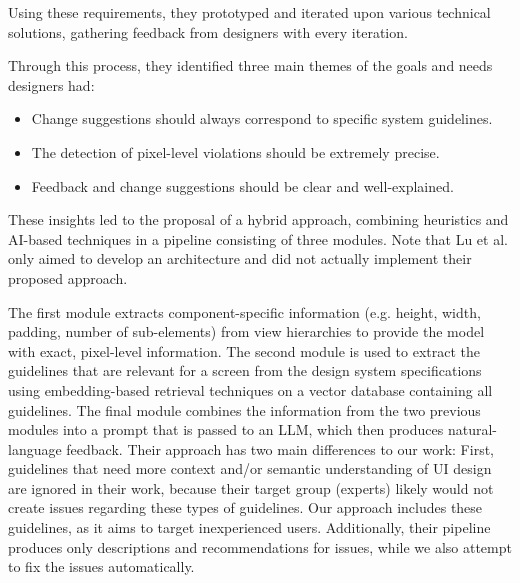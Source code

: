\documentclass[11pt,titlepage,oneside,openany]{book}
\begin{document}
Using these requirements, they prototyped and iterated upon various technical solutions, gathering feedback from designers with every iteration. \pagebreak

Through this process, they identified three main themes of the goals and needs designers had:

\begin{samepage}
	\begin{itemize}
		\item Change suggestions should always correspond to specific system guidelines.
		\item The detection of pixel-level violations should be extremely precise.
		\item Feedback and change suggestions should be clear and well-explained.
	\end{itemize}
\end{samepage}


These insights led to the proposal of a hybrid approach, combining heuristics and AI-based techniques in a pipeline consisting of three modules. Note that Lu et al. only aimed to develop an architecture and did not actually implement their proposed approach.

The first module extracts component-specific information (e.g. height, width, padding, number of sub-elements) from view hierarchies to provide the model with exact, pixel-level information. The second module is used to extract the guidelines that are relevant for a screen from the design system specifications using embedding-based retrieval techniques on a vector database containing all guidelines. The final module combines the information from the two previous modules into a prompt that is passed to an LLM, which then produces natural-language feedback. Their approach has two main differences to our work: First, guidelines that need more context and/or semantic understanding of UI design are ignored in their work, because their target group (experts) likely would not create issues regarding these types of guidelines. Our approach includes these guidelines, as it aims to target inexperienced users. Additionally, their pipeline produces only descriptions and recommendations for issues, while we also attempt to fix the issues automatically.
\end{document}

